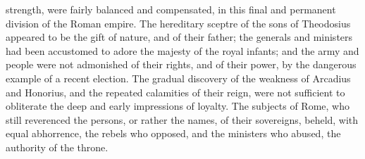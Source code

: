 strength, were fairly balanced and compensated, in this final and
permanent division of the Roman empire. The hereditary sceptre of
the sons of Theodosius appeared to be the gift of nature, and of
their father; the generals and ministers had been accustomed to
adore the majesty of the royal infants; and the army and people
were not admonished of their rights, and of their power, by the
dangerous example of a recent election. The gradual discovery of
the weakness of Arcadius and Honorius, and the repeated
calamities of their reign, were not sufficient to obliterate the
deep and early impressions of loyalty. The subjects of Rome, who
still reverenced the persons, or rather the names, of their
sovereigns, beheld, with equal abhorrence, the rebels who
opposed, and the ministers who abused, the authority of the
throne.

